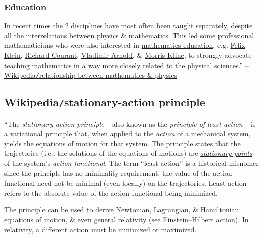 \documentclass{article}
\begin{document}
\subsubsection{Education}
In recent times the 2 disciplines have most often been taught separately, despite all the interrelations between physics \& mathematics. This led some professional mathematicians who were also interested in \href{https://en.wikipedia.org/wiki/Mathematics_education}{mathematics education}, e.g. \href{https://en.wikipedia.org/wiki/Felix_Klein}{\sc Felix Klein}, \href{https://en.wikipedia.org/wiki/Richard_Courant}{\sc Richard Courant}, \href{https://en.wikipedia.org/wiki/Vladimir_Arnold}{\sc Vladimir Arnold}, \& \href{https://en.wikipedia.org/wiki/Morris_Kline}{\sc Morris Kline}, to strongly advocate teaching mathematics in a way more closely related to the physical sciences.'' -- \href{https://en.wikipedia.org/wiki/Relationship_between_mathematics_and_physics}{Wikipedia{\tt/}relationship between mathematics \& physics}


\subsection{Wikipedia{\tt/}stationary-action principle}
``The \textit{stationary-action principle} -- also known as the \textit{principle of least action} -- is a \href{https://en.wikipedia.org/wiki/Variational_principle}{variational principle} that, when applied to the \href{https://en.wikipedia.org/wiki/Action_(physics)}{\textit{action}} of a \href{https://en.wikipedia.org/wiki/Mechanics}{mechanical} system, yields the \href{https://en.wikipedia.org/wiki/Equations_of_motion}{equations of motion} for that system. The principle states that the trajectories (i.e., the solutions of the equations of motions) are \href{https://en.wikipedia.org/wiki/Stationary_point}{\textit{stationary points}} of the system's \textit{action functional}. The term ``least action'' is a historical misnomer since the principle has no minimality requirement: the value of the action functional need not be minimal (even locally) on the trajectories. Least action refers to the absolute value of the action functional being minimized.

The principle can be used to derive \href{https://en.wikipedia.org/wiki/Newtonian_mechanics}{Newtonian}, \href{https://en.wikipedia.org/wiki/Lagrangian_mechanics}{Lagrangian}, \& \href{https://en.wikipedia.org/wiki/Hamiltonian_mechanics}{Hamiltonian} \href{https://en.wikipedia.org/wiki/Equations_of_motion}{equations of motion}, \& even \href{https://en.wikipedia.org/wiki/General_relativity}{general relativity} (see \href{https://en.wikipedia.org/wiki/Einstein%E2%80%93Hilbert_action}{Einstein--Hilbert action}). In relativity, a different action must be minimized or maximized.
\end{document}
